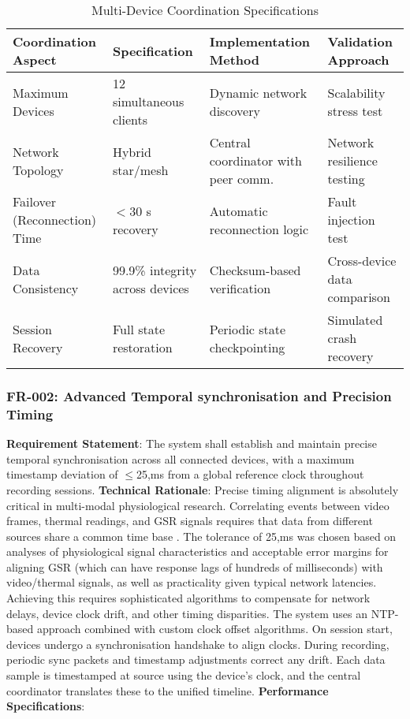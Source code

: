 \documentclass[11pt,a4paper]{report}
\begin{document}
\begin{table}[h]
\centering
\caption{Multi-Device Coordination Specifications}
\label{tab:coord_specs}
\begin{tabular}{p{3.5cm} p{3.8cm} p{4.2cm} p{3.6cm}}
\toprule
\textbf{Coordination Aspect} & \textbf{Specification} & \textbf{Implementation Method} & \textbf{Validation Approach} \\
\midrule
Maximum Devices & 12 simultaneous clients & Dynamic network discovery & Scalability stress test \\
Network Topology & Hybrid star/mesh & Central coordinator with peer comm. & Network resilience testing \\
Failover (Reconnection) Time & $<$30 s recovery & Automatic reconnection logic & Fault injection test \\
Data Consistency & 99.9\% integrity across devices & Checksum-based verification & Cross-device data comparison \\
Session Recovery & Full state restoration & Periodic state checkpointing & Simulated crash recovery \\
\bottomrule
\end{tabular}
\end{table} \subsubsection*{FR-002: Advanced Temporal synchronisation and Precision Timing}
\textbf{Requirement Statement}: The system shall establish and maintain precise temporal synchronisation across all connected devices, with a maximum timestamp deviation of $\leq$25,ms from a global reference clock throughout recording sessions. \textbf{Technical Rationale}: Precise timing alignment is absolutely critical in multi-modal physiological research. Correlating events between video frames, thermal readings, and GSR signals requires that data from different sources share a common time base \cite{Mills2006NTP}. The tolerance of 25,ms was chosen based on analyses of physiological signal characteristics and acceptable error margins for aligning GSR (which can have response lags of hundreds of milliseconds) with video/thermal signals, as well as practicality given typical network latencies. Achieving this requires sophisticated algorithms to compensate for network delays, device clock drift, and other timing disparities. The system uses an NTP-based approach combined with custom clock offset algorithms. On session start, devices undergo a synchronisation handshake to align clocks. During recording, periodic sync packets and timestamp adjustments correct any drift. Each data sample is timestamped at source using the device's clock, and the central coordinator translates these to the unified timeline. \textbf{Performance Specifications}:
\end{document}
